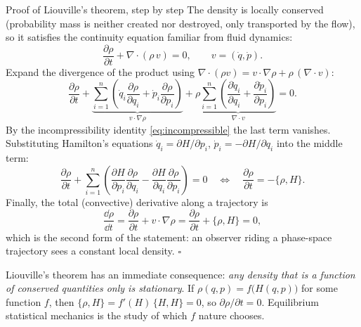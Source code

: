 \begin{toolbox}{Proof of Liouville's theorem, step by step}
The density is locally conserved (probability mass is neither created nor
destroyed, only transported by the flow), so it satisfies the continuity
equation familiar from fluid dynamics:
\begin{equation*}
  \frac{\partial \rho}{\partial t} + \nabla \cdot (\rho\, v) = 0,
  \qquad v = (\dot q, \dot p).
\end{equation*}
Expand the divergence of the product using
$\nabla \cdot (\rho v) = v \cdot \nabla \rho + \rho\, (\nabla \cdot v)$:
\begin{equation*}
  \frac{\partial \rho}{\partial t}
  + \underbrace{\sum_{i=1}^n \left(
      \dot q_i \frac{\partial \rho}{\partial q_i}
      + \dot p_i \frac{\partial \rho}{\partial p_i}\right)}_{v \cdot \nabla \rho}
  + \rho \underbrace{\sum_{i=1}^n \left(
      \frac{\partial \dot q_i}{\partial q_i}
      + \frac{\partial \dot p_i}{\partial p_i}\right)}_{\nabla \cdot v}
  = 0 .
\end{equation*}
By the incompressibility identity \eqref{eq:incompressible} the last term
vanishes. Substituting Hamilton's equations
$\dot q_i = \partial H/\partial p_i$, $\dot p_i = -\partial H/\partial q_i$
into the middle term:
\begin{equation*}
  \frac{\partial \rho}{\partial t}
  + \sum_{i=1}^n \left(
      \frac{\partial H}{\partial p_i}\frac{\partial \rho}{\partial q_i}
      - \frac{\partial H}{\partial q_i}\frac{\partial \rho}{\partial p_i}
    \right) = 0
  \quad\Longleftrightarrow\quad
  \frac{\partial \rho}{\partial t} = -\{\rho, H\}.
\end{equation*}
Finally, the total (convective) derivative along a trajectory is
\begin{equation*}
  \frac{\dd \rho}{\dd t}
  = \frac{\partial \rho}{\partial t} + v \cdot \nabla \rho
  = \frac{\partial \rho}{\partial t} + \{\rho, H\}
  = 0 ,
\end{equation*}
which is the second form of the statement: an observer riding a
phase-space trajectory sees a constant local density. \hfill$\square$
\end{toolbox}

Liouville's theorem has an immediate consequence: \emph{any density that
is a function of conserved quantities only is stationary}. If
$\rho(q,p) = f\big(H(q,p)\big)$ for some function $f$, then
$\{\rho, H\} = f'(H)\,\{H, H\} = 0$, so $\partial \rho / \partial t = 0$.
Equilibrium statistical mechanics is the study of which $f$ nature
chooses.

